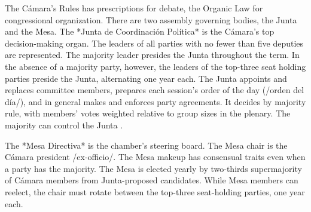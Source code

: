 \documentclass[letter,12pt]{article}
\begin{document}

The Cámara's Rules \citep{reglamentoDipMx.2019} has prescriptions for debate, the Organic Law \citep{loceum.2019} for congressional organization. There are two assembly governing bodies, the Junta and the Mesa. The *Junta de Coordinación Política* is the Cámara's top decision-making organ. The leaders of all parties with no fewer than five deputies are represented. The majority leader presides the Junta throughout the term. In the absence of a majority party, however, the leaders of the top-three seat holding parties preside the Junta, alternating one year each. The Junta appoints and replaces committee members, prepares each session's order of the day (/orden del día/), and in general makes and enforces party agreements. It decides by majority rule, with members' votes weighted relative to group sizes in the plenary. The majority can control the Junta \citep[cf.][]{cox.mccubbins.2005}.


The *Mesa Directiva* is the chamber's steering board. The Mesa chair is the Cámara president /ex-officio/. The Mesa makeup has consensual traits even when a party has the majority. The Mesa is elected yearly by two-thirds supermajority of Cámara members from Junta-proposed candidates. While Mesa members can reelect, the chair must rotate between the top-three seat-holding parties, one year each. 


\end{document}
